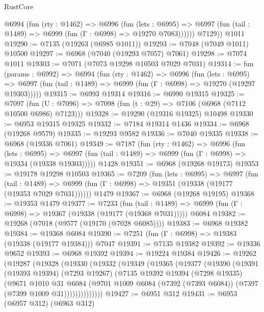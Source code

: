 \begin{lexlean}{RustCore}
\begin{coremodule}
          @6994
            (fun (rty : @1462) =>
            @6996
              (fun (lets : @6995) =>
              @6997 (fun (tail : @1489) => @6999 (fun (Γ : @6998) => @19270 @7083))))))
        @7129))
    @1011
@19290 := @7135 (@19263 (@6985 @1011))
@19293 := @7048 (@7049 @1011) @10500
@19297 := @6968 (@7040 (@19293 @7057) @7061)
@19298 := @7074 @1011
@19303 := @7071 (@7073 @19298 @10503 @7029 @7031)
@19314 := fun (params : @6992) =>
  @6994
    (fun (rty : @1462) =>
    @6996
      (fun (lets : @6995) =>
      @6997 (fun (tail : @1489) => @6999 (fun (Γ : @6998) => @19270 (@19297 @19303)))))
@19315 := @6993 @19314
@19316 := @6990 @19315
@19325 := @7097
    (fun (U : @7096) => @7098 (fun (t : @29) => @7106 (@6968 (@7112 @10500 @6986) @7123)))
@19328 := @19290 (@19316 @19325) @10498
@19330 := @6953 @19315 @19325
@19332 := @7184 @19314 @1436
@19334 := @6968 (@19268 @9579)
@19335 := @19293 @9582
@19336 := @7040 @19335
@19338 := @6968 (@19336 @7061)
@19349 := @7187
    (fun (rty : @1462) =>
    @6996
      (fun (lets : @6995) =>
      @6997 (fun (tail : @1489) => @6999 (fun (Γ : @6998) => @19334 (@19338 @19303)))))
    @1428
@19351 := @6968 (@19268 @19173)
@19353 := @19178 @19298 @10503
@19365 := @7209
    (fun (lets : @6995) =>
    @6997
      (fun (tail : @1489) =>
      @6999 (fun (Γ : @6998) => @19351 (@19338 (@19177 (@19353 @7029 @7031))))))
    @1479
@19367 := @6968 (@19268 @19195)
@19368 := @19353 @1479
@19377 := @7233
    (fun (tail : @1489) => @6999 (fun (Γ : @6998) => @19367 (@19338 (@19177 (@19368 @7031)))))
    @6084
@19382 := @19268 (@7018 (@9577 (@19170 (@7028 @6085))))
@19383 := @6968 @19382
@19384 := @19368 @6084
@19390 := @7251 (fun (Γ : @6998) => @19383 (@19338 (@19177 @19384))) @7047
@19391 := @7135 @19382
@19392 := @19336 @9652
@19393 := @6968 @19392
@19394 := @19224 @19384
@19426 := @19262
    (@19287
      (@19328
        (@19330
          (@19332
            (@19349
              (@19365
                (@19377
                  (@19390
                    (@19391
                      (@19393 @19394)
                      (@7293 @19267)
                      (@7135
                        @19392
                        @19394
                        (@7298 @19335)
                        (@9671
                          @1010
                          @31
                          @6084
                          (@9701
                            @1009
                            @6084
                            (@7392 (@7393 @6084))
                            (@7397 (@7399 @1009 @31))))))))))))))
@19427 := @6951 @312
@19431 := @6953 (@6957 @312) (@6963 @312)

\end{coremodule}
\end{lexlean}
